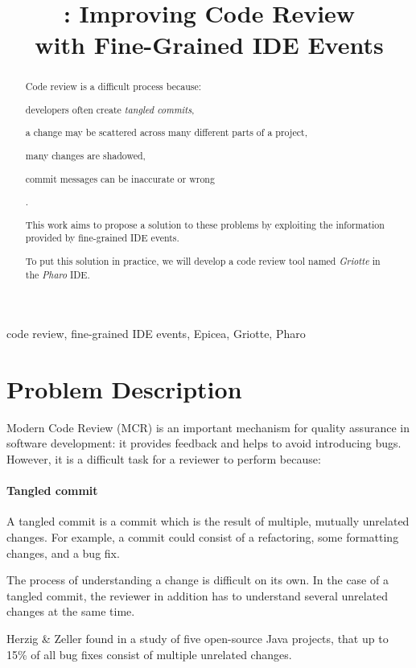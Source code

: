 \documentclass[conference,a4paper]{IEEEtran}
\title{\Gr{}: Improving Code Review\\with Fine-Grained IDE Events}
\author{\IEEEauthorblockN{Skip~Lentz}\IEEEauthorblockA{EEMCS\\Delft
    University of Technology} \and
  \IEEEauthorblockN{Mart\'{i}n~Dias}\IEEEauthorblockA{RMoD\\INRIA
    Lille-Nord Europe} \and
  \IEEEauthorblockN{Damien~Cassou}\IEEEauthorblockA{RMoD\\INRIA
    Lille-Nord Europe}}
\newcommand{\TC}{tangled commit}
\newcommand{\Ep}{Epicea}
\newcommand{\Gr}{Griotte}
\begin{document}
\maketitle{}
\begin{abstract}
  Code review is a difficult process because:
  \begin{enumerate*}[label=(\arabic*)]
  \item developers often create \textit{tangled commits},
  \item a change may be scattered across many different parts of a
    project,
  \item many changes are shadowed,
  \item commit messages can be inaccurate or wrong
  \end{enumerate*}.

  This work aims to propose a solution to these problems by exploiting
  the information provided by fine-grained IDE events.

  To put this solution in practice, we will develop a code review tool
  named \textit{\Gr} in the \textit{Pharo} IDE.
\end{abstract}
\begin{IEEEkeywords}
  code review, fine-grained IDE events, \Ep, \Gr, Pharo
\end{IEEEkeywords}

\section{Problem Description}
\label{sec:problem-description}
Modern Code Review (MCR) is an important mechanism for quality
assurance in software development: it provides feedback and helps to
avoid introducing bugs. However, it is a difficult task for a reviewer
to perform because:

\paragraph{Tangled commit}

A \TC{} is a commit which is the result of multiple, mutually
unrelated changes. For example, a commit could consist of a
refactoring, some formatting changes, and a bug fix.

The process of understanding a change is difficult on its own. In the
case of a tangled commit, the reviewer in addition has to understand
several unrelated changes at the same time.

Herzig \& Zeller found in a study of five open-source Java projects,
that up to 15\% of all bug fixes consist of multiple unrelated
changes\cite{Herz11a}.
\end{document}
